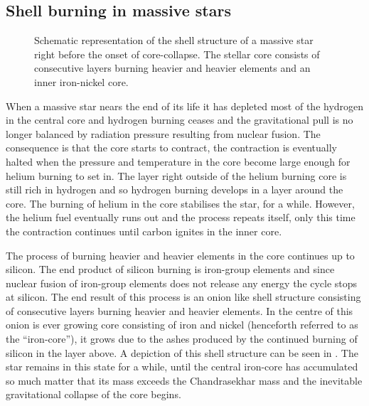 \subsection{Shell burning in massive stars}
\begin{wrapfigure}{r}{0.5\textwidth}
\caption{Schematic representation of the shell structure of a massive star right before
the onset of core-collapse. The stellar core consists of consecutive layers burning heavier
and heavier elements and an inner iron-nickel core.}
 \label{figSN:onion}
\end{wrapfigure}
When a massive star nears the end of its life it has depleted most of the hydrogen in the central core
and hydrogen burning ceases and the gravitational pull is no longer balanced by radiation pressure resulting
from nuclear fusion. The consequence is that the core starts to contract, the contraction is eventually halted when the pressure
and temperature in the core become large enough for helium burning to set in. The layer right outside of the helium burning core is still rich
in hydrogen and so hydrogen burning develops in a layer around the core. The burning of helium in the core stabilises the star, for a while.
However, the helium fuel eventually runs out and the process repeats itself, only this time the contraction continues until carbon ignites in the inner core. 

The process of burning heavier and heavier elements in the core continues up to silicon. The end product of silicon burning is iron-group elements and
since nuclear fusion of iron-group elements does not release any energy the cycle stops at silicon. The end result of this process is
an onion like shell structure consisting of consecutive layers burning heavier and heavier elements. In the centre of this onion is ever growing
core consisting of iron and nickel (henceforth referred to as the ``iron-core''), it grows due to the ashes produced by the continued burning of silicon in the layer above. A depiction of this shell structure can be seen in .
The star remains in this state for a while,
until the central iron-core has accumulated so much matter that its mass exceeds the Chandrasekhar mass and the inevitable gravitational collapse 
of the core begins.

